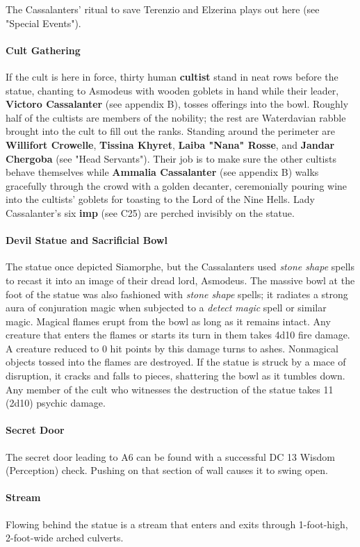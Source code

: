\documentclass[10pt,a4paper,twoside,twocolumn,openany,nodeprecatedcode]{dndbook}
\begin{document}
The Cassalanters' ritual to save Terenzio and Elzerina plays out here (see "Special Events").
\paragraph{Cult Gathering}
If the cult is here in force, thirty human \textbf{cultist} stand in neat rows before the statue, chanting to Asmodeus with wooden goblets in hand while their leader, \textbf{Victoro Cassalanter} (see appendix B), tosses offerings into the bowl. Roughly half of the cultists are members of the nobility; the rest are Waterdavian rabble brought into the cult to fill out the ranks. Standing around the perimeter are \textbf{Willifort Crowelle}, \textbf{Tissina Khyret}, \textbf{Laiba "Nana" Rosse}, and \textbf{Jandar Chergoba} (see "Head Servants"). Their job is to make sure the other cultists behave themselves while \textbf{Ammalia Cassalanter} (see appendix B) walks gracefully through the crowd with a golden decanter, ceremonially pouring wine into the cultists' goblets for toasting to the Lord of the Nine Hells. Lady Cassalanter's six \textbf{imp} (see C25) are perched invisibly on the statue.
\paragraph{Devil Statue and Sacrificial Bowl}
The statue once depicted Siamorphe, but the Cassalanters used \textit{stone shape} spells to recast it into an image of their dread lord, Asmodeus. The massive bowl at the foot of the statue was also fashioned with \textit{stone shape} spells; it radiates a strong aura of conjuration magic when subjected to a \textit{detect magic} spell or similar magic. Magical flames erupt from the bowl as long as it remains intact. Any creature that enters the flames or starts its turn in them takes 4d10 fire damage. A creature reduced to 0 hit points by this damage turns to ashes. Nonmagical objects tossed into the flames are destroyed.
If the statue is struck by a mace of disruption, it cracks and falls to pieces, shattering the bowl as it tumbles down. Any member of the cult who witnesses the destruction of the statue takes 11 (2d10) psychic damage.
\paragraph{Secret Door}
The secret door leading to A6 can be found with a successful DC 13 Wisdom (Perception) check. Pushing on that section of wall causes it to swing open.
\paragraph{Stream}
Flowing behind the statue is a stream that enters and exits through 1-foot-high, 2-foot-wide arched culverts.
\end{document}
